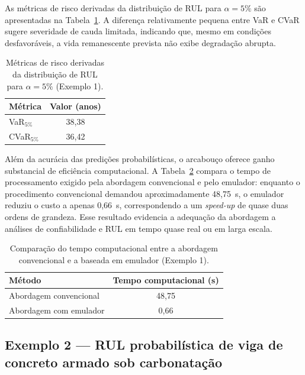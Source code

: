 As métricas de risco derivadas da distribuição de RUL para $\alpha = 5\%$ são apresentadas na Tabela~\ref{tab:var_cvar_rul}. A diferença relativamente pequena entre VaR e CVaR sugere severidade de cauda limitada, indicando que, mesmo em condições desfavoráveis, a vida remanescente prevista não exibe degradação abrupta.

\begin{table}[H]
\centering
\caption{Métricas de risco derivadas da distribuição de RUL para $\alpha = 5\%$ (Exemplo 1).}
\label{tab:var_cvar_rul}
\begin{tabular}{lc}
\hline
\textbf{Métrica} & \textbf{Valor (anos)} \\
\hline
VaR$_{5\%}$  & 38,38 \\
CVaR$_{5\%}$ & 36,42 \\
\hline
\end{tabular}
\end{table}

Além da acurácia das predições probabilísticas, o arcabouço oferece ganho substancial de eficiência computacional. A Tabela~\ref{tab:computational_time} compara o tempo de processamento exigido pela abordagem convencional e pelo emulador: enquanto o procedimento convencional demandou aproximadamente 48,75~s, o emulador reduziu o custo a apenas 0,66~s, correspondendo a um \textit{speed-up} de quase duas ordens de grandeza. Esse resultado evidencia a adequação da abordagem a análises de confiabilidade e RUL em tempo quase real ou em larga escala.

\begin{table}[H]
\centering
\caption{Comparação do tempo computacional entre a abordagem convencional e a baseada em emulador (Exemplo 1).}
\label{tab:computational_time}
\begin{tabular}{l c}
\hline
\textbf{Método} & \textbf{Tempo computacional (s)} \\
\hline
Abordagem convencional & 48,75 \\
Abordagem com emulador & 0,66 \\
\hline
\end{tabular}
\end{table}

\subsection{Exemplo 2 --- RUL probabil\'istica de viga de concreto armado sob carbonata\c{c}\~ao}
\label{subsec:exemplo2}


